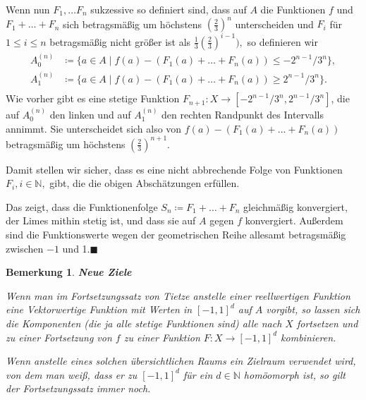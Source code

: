 \documentclass[12pt]{scrbook}   %
\newtheorem{bemX}[alles]{Bemerkung}
\newenvironment{bem}[1]{\begin{bemX}{\bf #1}\par\rm}{\end{bemX}}
\newcommand{\qed}{\phantom{.}\hfill{$\blacksquare$}}
\newcommand{\da}{\coloneqq}
\begin{document}
Wenn nun $F_1,\dots F_n$ sukzessive so definiert sind, dass auf $A$
die Funktionen $f$ und $F_1+\dots +F_n$ sich betragsm\"a\ss ig um h\"ochstens 
$(\frac23)^n$ unterscheiden und $F_i$ f\"ur $1\leq i\leq n$ betragsm\"a\ss ig
nicht gr\"o\ss er ist als $\frac13(\frac23)^{i-1}),$ so definieren wir
$$\begin{array}{ll}
A_0^{(n)}&\da\{a\in A\mid f(a)-(F_1(a)+\dots +F_n(a))\leq -2^{n-1}/3^n\},\\
A_1^{(n)}&\da \{a\in A\mid f(a)-(F_1(a)+\dots +F_n(a))\geq 2^{n-1}/3^n\}.\\
\end{array}$$ 
Wie vorher gibt es eine stetige Funktion $F_{n+1}:X\longrightarrow [-2^{n-1}/3^n,
2^{n-1}/3^n]$, die auf $A_0^{(n)}$ den linken und auf $A_1^{(n)}$ den rechten
Randpunkt des Intervalls annimmt. Sie unterscheidet sich also von 
$f(a)-(F_1(a)+\dots +F_n(a))$ betragsm\"a\ss ig um h\"ochstens 
$(\frac23)^{n+1}.$

Damit stellen wir sicher, dass es eine nicht abbrechende Folge von Funktionen
$F_i,i\in \mathbb N,$ gibt, die die obigen Absch\"atzungen erf\"ullen.

Das zeigt, dass die Funktionenfolge $S_n\da F_1+\dots +F_n$ gleichm\"a\ss ig
konvergiert, der Limes mithin stetig ist, und dass sie auf $A$ gegen
$f$ konvergiert. Au\ss erdem sind die Funktionswerte wegen der geometrischen 
Reihe allesamt betragsm\"a\ss ig zwischen $-1$ und 1.\qed


\begin{bem} {Neue Ziele}
Wenn man im Fortsetzungssatz von Tietze anstelle einer reellwertigen Funktion
eine Vektorwertige Funktion mit Werten in $[-1,1]^d$ auf $A$ vorgibt, so lassen 
sich die Komponenten (die ja alle stetige Funktionen sind) alle nach $X$ 
fortsetzen und zu einer Fortsetzung von $f$ zu einer Funktion 
$F:X\longrightarrow [-1,1]^d$ kombinieren.

Wenn anstelle eines solchen \"ubersichtlichen Raums ein Zielraum verwendet 
wird, von dem man wei\ss , dass er zu $[-1,1]^d$ f\"ur ein $d\in \mathbb N$ 
hom\"oomorph ist, so gilt der Fortsetzungssatz immer noch.
\end{bem}
\end{document}
